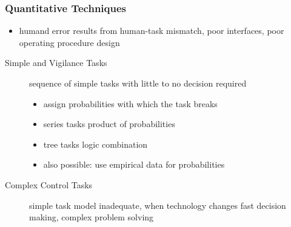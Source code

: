 \documentclass[a4paper, 10pt]{article}
\begin{document}
\subsubsection*{Quantitative Techniques}
\begin{itemize}
    \item humand error results from human-task mismatch, poor interfaces, poor operating procedure design
\end{itemize}
\begin{description}
    \item[Simple and Vigilance Tasks] sequence of simple tasks with little to no decision required
    \begin{itemize}
        \item assign probabilities with which the task breaks
        \item series tasks \follows product of probabilities
        \item tree tasks \follows logic combination
        \item also possible: use empirical data for probabilities
    \end{itemize}
    \item[Complex Control Tasks] simple task model inadequate, when technology changes fast \follows decision making, complex problem solving
\end{description}
\end{document}
